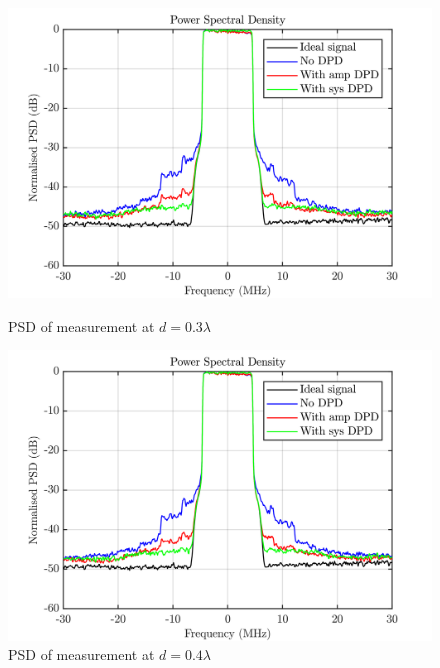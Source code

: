 \begin{figure}[H]
  \centering
  \begin{minipage}[b]{0.5\textwidth}
	\includegraphics[scale = 0.5]{figures/measurement/cree/meas3/psd_0p3.png}
	\caption{PSD of measurement at $d = 0.3\lambda$ }	
    \label{fig:meas4_psd3}
  \end{minipage}
  \hfill
  \begin{minipage}[b]{0.4\textwidth}
	\includegraphics[scale = 0.5]{figures/measurement/cree/meas3/psd_0p4.png}
	\caption{PSD of measurement at $d = 0.4\lambda$}
    \label{fig:meas4_psd4}
  \end{minipage}
\end{figure}


